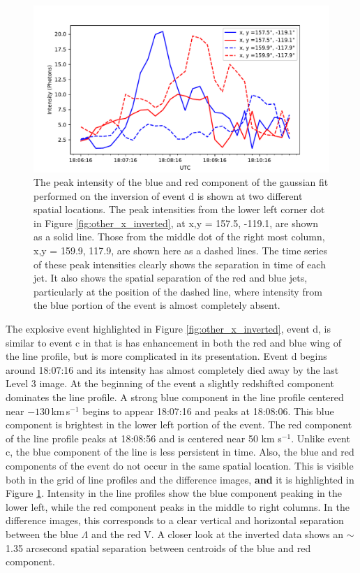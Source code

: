 \documentclass[linenumbers,trackchanges]{aastex63}
\begin{document}
			\begin{figure}
				\includegraphics{otherx_timeseries.pdf}
				\caption{The peak intensity of the blue and red component of the gaussian fit performed on the inversion of event d is shown at two different spatial locations.
				The peak intensities from the lower left corner dot in Figure \ref{fig:other_x_inverted}, at x,y = 157.5\arcsec, -119.1\arcsec, are shown as a solid line.
				Those from the middle dot of the right most column, x,y = 159.9\arcsec, 117.9\arcsec, are shown here as a dashed lines.
				The time series of these peak intensities clearly shows the separation in time of each jet.
				It also shows the spatial separation of the red and blue jets, particularly at the position of the dashed line, where intensity from the blue portion of the event is almost completely absent.
				}
				\label{fig:otherx_timeseries}
			\end{figure}
		
		The explosive event highlighted in Figure \ref{fig:other_x_inverted}, event d, is similar to event c in that is has enhancement in both the red and blue wing of the line profile, but is more complicated in its presentation.
		Event d  begins around 18:07:16 and its intensity has almost completely died away by the last Level 3 image.
		At the beginning of the event a slightly redshifted component dominates the line profile.
		A strong blue component in the line profile centered near $-130$\,km\,s$^{-1}$ begins to appear 18:07:16 and peaks at 18:08:06. 
		This blue component is brightest in the lower left portion of the event.
		The red component of the line profile peaks at 18:08:56 and is centered near 50 km s$^{-1}$.
		Unlike event c, the blue component of the line is less persistent in time.
		Also, the blue and red components of the event do not occur in the same spatial location.
		This is visible both in the grid of line profiles and the difference images, \textbf{and} it is highlighted in Figure \ref{fig:otherx_timeseries}.
		Intensity in the line profiles show the blue component peaking in the lower left, while the red component peaks in the middle to right columns.
		In the difference images, this corresponds to a clear vertical and horizontal separation between the blue $\Lambda$ and the red V. 
		A closer look at the inverted data shows an $\sim$ 1.35 arcsecond spatial separation between centroids of the blue and red component.
	    
\end{document}

